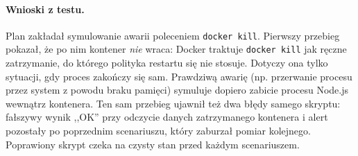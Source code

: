 \paragraph{Wnioski z testu.} Plan zakładał symulowanie awarii poleceniem
\texttt{docker kill}. Pierwszy przebieg pokazał, że po nim kontener
\emph{nie} wraca: Docker traktuje \texttt{docker kill} jak ręczne zatrzymanie,
do którego polityka restartu się nie stosuje. Dotyczy ona tylko sytuacji, gdy
proces zakończy się sam. Prawdziwą awarię (np. przerwanie procesu przez
system z powodu braku pamięci) symuluje dopiero zabicie procesu Node.js
wewnątrz kontenera. Ten sam przebieg ujawnił też dwa błędy samego skryptu:
fałszywy wynik ,,OK'' przy odczycie danych zatrzymanego kontenera i alert
pozostały po poprzednim scenariuszu, który zaburzał pomiar kolejnego.
Poprawiony skrypt czeka na czysty stan przed każdym scenariuszem.
